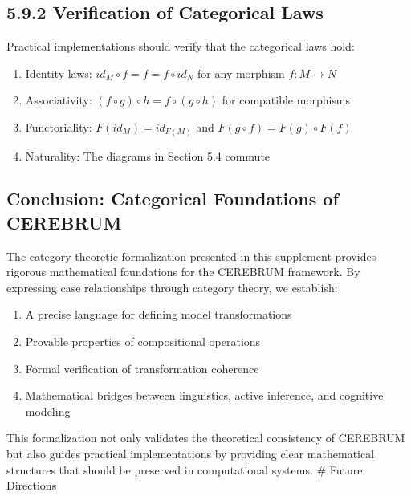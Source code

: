 \documentclass[
  11pt,
  letterpaper,
]{article}
\providecommand{\tightlist}{%
  \setlength{\itemsep}{0pt}\setlength{\parskip}{0pt}}
\begin{document}
\hypertarget{verification-of-categorical-laws}{%
\subsection{5.9.2 Verification of Categorical
Laws}\label{verification-of-categorical-laws}}

Practical implementations should verify that the categorical laws hold:

\begin{enumerate}
\def\labelenumi{\arabic{enumi}.}
\tightlist
\item
  Identity laws: \(id_M \circ f = f = f \circ id_N\) for any morphism
  \(f: M \rightarrow N\)
\item
  Associativity: \((f \circ g) \circ h = f \circ (g \circ h)\) for
  compatible morphisms
\item
  Functoriality: \(F(id_M) = id_{F(M)}\) and
  \(F(g \circ f) = F(g) \circ F(f)\)
\item
  Naturality: The diagrams in Section 5.4 commute
\end{enumerate}

\hypertarget{conclusion-categorical-foundations-of-cerebrum}{%
\subsection{Conclusion: Categorical Foundations of
CEREBRUM}\label{conclusion-categorical-foundations-of-cerebrum}}

The category-theoretic formalization presented in this supplement
provides rigorous mathematical foundations for the CEREBRUM framework.
By expressing case relationships through category theory, we establish:

\begin{enumerate}
\def\labelenumi{\arabic{enumi}.}
\tightlist
\item
  A precise language for defining model transformations
\item
  Provable properties of compositional operations
\item
  Formal verification of transformation coherence
\item
  Mathematical bridges between linguistics, active inference, and
  cognitive modeling
\end{enumerate}

This formalization not only validates the theoretical consistency of
CEREBRUM but also guides practical implementations by providing clear
mathematical structures that should be preserved in computational
systems. \# Future Directions
\end{document}
